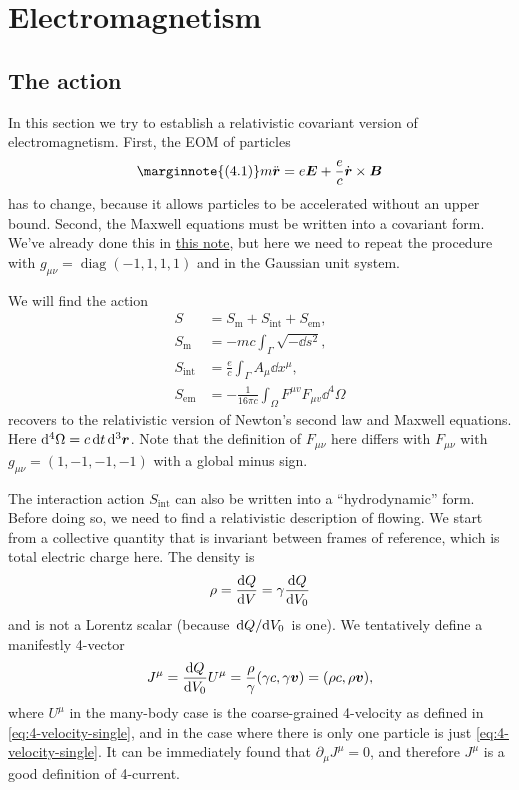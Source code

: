 \documentclass[hyperref, a4paper]{article}
\DeclareMathOperator{\diag}{diag}
\begin{document}
\section{Electromagnetism}

\subsection{The action}

In this section we try to establish a relativistic covariant version of electromagnetism.
First, the EOM of particles 
\begin{equation} \marginnote{(4.1)}
    m \ddot{\vb*{r}} = e \vb*{E} + \frac{e}{c} \dot{\vb*{r}} \times \vb*{B} 
\end{equation}
has to change, because it allows particles to be accelerated without an upper bound. 
Second, the Maxwell equations must be written into a covariant form. 
We've already done this in \href{../advanced-electrodynamics/lecture-12-15.pdf}{this note}, 
but here we need to repeat the procedure with $g_{\mu \nu} = \diag(-1, 1, 1, 1)$ and in the Gaussian 
unit system. 

We will find the action 
\begin{equation}
    \begin{aligned}
        S&=S_{\mathrm{m}}+S_{\mathrm{int}}+S_{\mathrm{em}}, \\
        S_{\mathrm{m}} &=-m c \int_{\Gamma} \sqrt{-\dd s^{2}}, \\
        S_{\mathrm{int}} &=\frac{e}{c} \int_{\Gamma} A_{\mu} \dd x^{\mu}, \\
        S_{\mathrm{em}} &=-\frac{1}{16 \pi c} \int_{\Omega} F^{\mu v} F_{\mu v} \dd^{4} \Omega
    \end{aligned}
\end{equation}
recovers to the relativistic version of Newton's second law and Maxwell equations.  
Here $\dd[4]{\Omega} = c \dd{t} \dd[3]{\vb*{r}}$.
Note that the definition of $F_{\mu \nu}$ here differs with $F_{\mu \nu}$ with $g_{\mu \nu} = (1, -1, -1, -1)$
with a global minus sign.

The interaction action $S_{\text{int}}$ can also be written into a ``hydrodynamic'' form. 
Before doing so, we need to find a relativistic description of flowing. We start from a collective quantity that 
is invariant between frames of reference, which is total electric charge here. 
The density is 
\begin{equation}
    \rho = \dv{Q}{V} = \gamma \dv{Q}{V_0}
\end{equation}
and is not a Lorentz scalar (because $\dv*{Q}{V_0}$ is one). We tentatively define a manifestly 4-vector 
\begin{equation}
    J^\mu = \dv{Q}{V_0} U^\mu = \frac{\rho}{\gamma} (\gamma c, \gamma \vb*{v}) = (\rho c, \rho \vb*{v}),
\end{equation}
where $U^\mu$ in the many-body case is the coarse-grained 4-velocity as defined in \eqref{eq:4-velocity-single},
and in the case where there is only one particle is just \eqref{eq:4-velocity-single}. 
It can be immediately found that $\partial_\mu J^\mu = 0$, and therefore $J^\mu$ is a good definition of 4-current.
\end{document}
